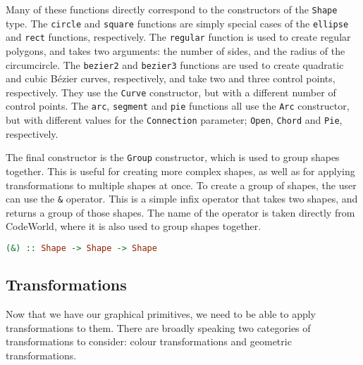 \documentclass[../main.tex]{subfiles}
\begin{document}
                Many of these functions directly correspond to the constructors of the
                    \texttt{Shape} type.
                The \texttt{circle} and \texttt{square} functions are simply special cases of
                    the \texttt{ellipse} and \texttt{rect} functions, respectively.
                The \texttt{regular} function is used to create regular polygons, and takes two
                    arguments: the number of sides, and the radius of the circumcircle.
                The \texttt{bezier2} and \texttt{bezier3} functions are used to create
                    quadratic and cubic Bézier curves, respectively, and take two and three control
                    points, respectively.
                They use the \texttt{Curve} constructor, but with a different number of control
                    points.
                The \texttt{arc}, \texttt{segment} and \texttt{pie} functions all use the
                    \texttt{Arc} constructor, but with different values for the \texttt{Connection}
                    parameter; \texttt{Open}, \texttt{Chord} and \texttt{Pie}, respectively.

                The final constructor is the \texttt{Group} constructor, which is used to group
                    shapes together.
                This is useful for creating more complex shapes, as well as for applying
                    transformations to multiple shapes at once.
                To create a group of shapes, the user can use the \verb|&| operator.
                This is a simple infix operator that takes two shapes, and returns a group of
                    those shapes.
                The name of the operator is taken directly from CodeWorld, where it is also
                    used to group shapes together.

                \begin{lstlisting}[language={Haskell}, label={lst:group}, caption={The group (\texttt{\&}) operator.}]
(&) :: Shape -> Shape -> Shape\end{lstlisting}

        \subsection{Transformations}
            Now that we have our graphical primitives, we need to be able to apply
                transformations to them.
            There are broadly speaking two categories of transformations to consider:
                colour transformations and geometric transformations.
\end{document}
